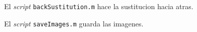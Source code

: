 \documentclass{article}
\begin{document}
\par El \textit{script} \verb+backSustitution.m+ hace la sustitucion hacia atras.

\begin{ttfamily}
\begin{center}
\end{center}
\end{ttfamily}


\par El \textit{script} \verb+saveImages.m+ guarda las imagenes.

\begin{ttfamily}
\begin{center}
\end{center}
\end{ttfamily}
\end{document}
